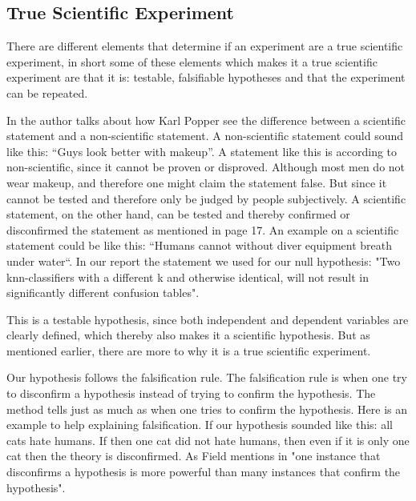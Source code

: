 \subsection{True Scientific Experiment}
There are different elements that determine if an experiment are a true scientific experiment, in short some of these elements which makes it a true scientific experiment are that it is: testable, falsifiable hypotheses and that the experiment can be repeated.

In \citep{Design} the author talks about how Karl Popper see the difference between a scientific statement and a non-scientific statement. A non-scientific statement could sound like this: “Guys look better with makeup”. A statement like this is according to \citep{Design} non-scientific, since it cannot be proven or disproved. Although most men do not wear makeup, and therefore one might claim the statement false. But since it cannot be tested and therefore only be judged by people subjectively. 
A scientific statement, on the other hand, can be tested and thereby confirmed or disconfirmed the statement as mentioned in \citep{Design} page 17. An example on a scientific statement could be like this: “Humans cannot without diver equipment breath under water“.
In our report the statement we used for our null hypothesis: "Two knn-classifiers with a different k and otherwise identical, will not result in significantly different confusion tables". 

This is a testable hypothesis, since both independent and dependent variables are clearly defined, which thereby also makes it a scientific hypothesis. But as mentioned earlier, there are more to why it is a true scientific experiment. 

Our hypothesis follows the falsification rule.
The falsification rule is when one try to disconfirm a hypothesis instead of trying to confirm the hypothesis. The method tells just as much as when one tries to confirm the hypothesis. Here is an example to help explaining  falsification. If our hypothesis sounded like this: all cats hate humans. If then one cat did not hate humans, then even if it is only one cat then the theory is disconfirmed. As Field mentions in \citep[page 17]{Design} "one instance that disconfirms a hypothesis is more powerful than many instances that confirm the hypothesis".

